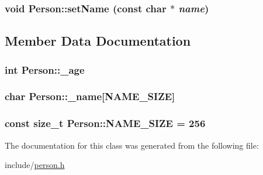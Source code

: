 \hypertarget{classPerson_e5f18cb79ba4e817f83ba561c8862f80}{
\subsubsection[{setName}]{\setlength{\rightskip}{0pt plus 5cm}void Person::setName (const char $\ast$ {\em name})}}
\label{classPerson_e5f18cb79ba4e817f83ba561c8862f80}




\subsection{Member Data Documentation}
\hypertarget{classPerson_a8b4383565d4f2419fd9dedd657e0422}{
\subsubsection[{\_\-age}]{\setlength{\rightskip}{0pt plus 5cm}int {\bf Person::\_\-age}}}
\label{classPerson_a8b4383565d4f2419fd9dedd657e0422}


\hypertarget{classPerson_7786299e5d7e6fd26829a17408c86baa}{
\subsubsection[{\_\-name}]{\setlength{\rightskip}{0pt plus 5cm}char {\bf Person::\_\-name}\mbox{[}{\bf NAME\_\-SIZE}\mbox{]}}}
\label{classPerson_7786299e5d7e6fd26829a17408c86baa}


\hypertarget{classPerson_1706118706f27dc1e7d7d9d3928d614e}{
\subsubsection[{NAME\_\-SIZE}]{\setlength{\rightskip}{0pt plus 5cm}const size\_\-t {\bf Person::NAME\_\-SIZE} = 256}}
\label{classPerson_1706118706f27dc1e7d7d9d3928d614e}




The documentation for this class was generated from the following file:\begin{CompactItemize}
\item 
include/\hyperlink{person_8h}{person.h}\end{CompactItemize}

